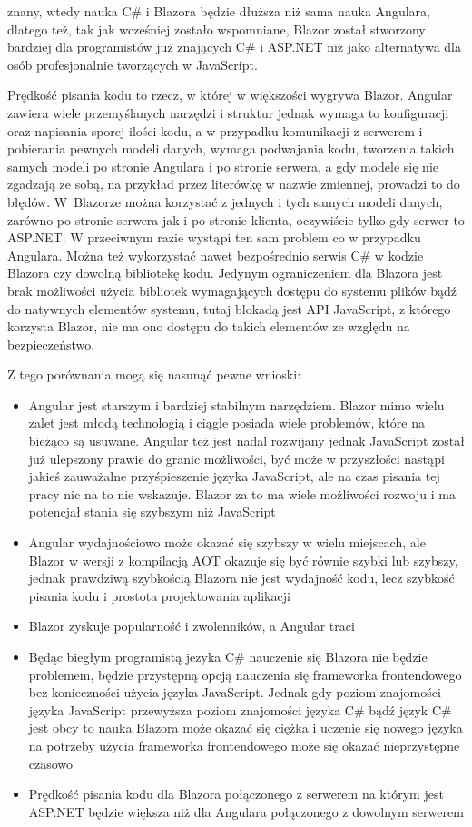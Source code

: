 \documentclass[12pt,a4paper,oneside]{book}
\begin{document}
znany, wtedy nauka C\# i Blazora będzie dłuższa niż sama nauka Angulara, dlatego też, tak jak wcześniej zostało wspomniane, Blazor został stworzony bardziej dla programistów już znających C\# i ASP.NET niż jako alternatywa dla osób profesjonalnie tworzących w JavaScript.

Prędkość pisania kodu to rzecz, w której w większości wygrywa Blazor. Angular zawiera wiele przemyślanych narzędzi i struktur jednak wymaga to konfiguracji oraz napisania sporej ilości kodu, a w przypadku komunikacji z serwerem i pobierania pewnych modeli danych, wymaga podwajania kodu, tworzenia takich samych modeli po stronie Angulara i po stronie serwera, a gdy modele się nie zgadzają ze sobą, na przykład przez literówkę w nazwie zmiennej, prowadzi to do błędów. W~Blazorze można korzystać z jednych i tych samych modeli danych, zarówno po stronie serwera jak i po stronie klienta, oczywiście tylko gdy serwer to ASP.NET. W przeciwnym razie wystąpi ten sam problem co w przypadku Angulara. Można też wykorzystać nawet bezpośrednio serwis C\# w kodzie Blazora czy dowolną bibliotekę kodu. Jedynym ograniczeniem dla Blazora jest brak możliwości użycia bibliotek wymagających dostępu do systemu plików bądź do natywnych elementów systemu, tutaj blokadą jest API JavaScript, z którego korzysta Blazor, nie ma ono dostępu do takich elementów ze względu na bezpieczeństwo.

Z tego porównania mogą się nasunąć pewne wnioski:

\begin{itemize}
  \item Angular jest starszym i bardziej stabilnym narzędziem. Blazor mimo wielu zalet jest młodą technologią i ciągle posiada wiele problemów, które na bieżąco są usuwane. Angular też jest nadal rozwijany jednak JavaScript został już ulepszony prawie do granic możliwości, być może w przyszłości nastąpi jakieś zauważalne przyśpieszenie języka JavaScript, ale na czas pisania tej pracy nic na to nie wskazuje. Blazor za to ma wiele możliwości rozwoju i ma potencjał stania się szybszym niż JavaScript
  \item Angular wydajnościowo może okazać się szybszy w wielu miejscach, ale Blazor w wersji z kompilacją AOT okazuje się być równie szybki lub szybszy, jednak prawdziwą szybkością Blazora nie jest wydajność kodu, lecz szybkość pisania kodu i prostota projektowania aplikacji
  \item Blazor zyskuje popularność i zwolenników, a Angular traci
  \item Będąc biegłym programistą jezyka C\# nauczenie się Blazora nie będzie problemem, będzie przystępną opcją nauczenia się frameworka frontendowego bez konieczności użycia języka JavaScript. Jednak gdy poziom znajomości języka JavaScript przewyższa poziom znajomości języka C\# bądź język C\# jest obcy to nauka Blazora może okazać się ciężka i uczenie się nowego języka na potrzeby użycia frameworka frontendowego może się okazać nieprzystępne czasowo
  \item Prędkość pisania kodu dla Blazora połączonego z serwerem na którym jest ASP.NET będzie większa niż dla Angulara połączonego z dowolnym serwerem
\end{itemize}
\end{document}
